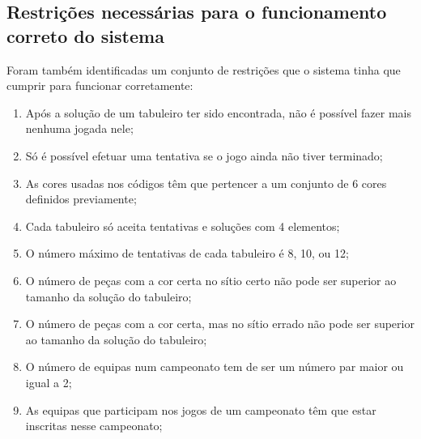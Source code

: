 \subsection{Restrições necessárias para o funcionamento correto do sistema}

Foram também identificadas um conjunto de restrições que o sistema
tinha que cumprir para funcionar corretamente:

\begin{enumerate}
\item Após a solução de um tabuleiro ter sido encontrada, não é possível fazer mais
  nenhuma jogada nele;
\item Só é possível efetuar uma tentativa se o jogo ainda não tiver terminado;
\item As cores usadas nos códigos têm que pertencer a um conjunto de 6
  cores definidos previamente;
\item Cada tabuleiro só aceita tentativas e soluções com 4 elementos;
\item O número máximo de tentativas de cada tabuleiro é 8, 10, ou 12;
\item O número de peças com a cor certa no sítio certo não pode ser
  superior ao tamanho da solução do tabuleiro;
\item O número de peças com a cor certa, mas no sítio errado não pode
  ser superior ao tamanho da solução do tabuleiro;
\item O número de equipas num campeonato tem de ser um número par
  maior ou igual a 2;
\item As equipas que participam nos jogos de um campeonato têm que
  estar inscritas nesse campeonato;
\end{enumerate}

